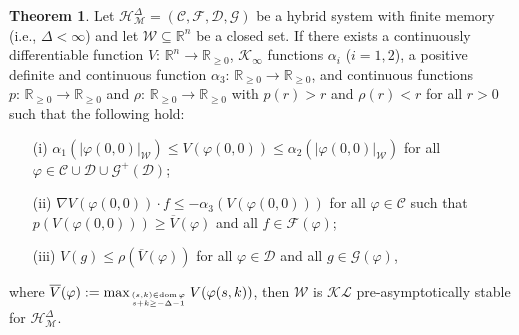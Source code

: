 \documentclass[journal,final,twocolumn]{IEEEtran}
\theoremstyle{definition}
\newtheorem{thm}{Theorem}
\begin{document}
\begin{thm}\label{thm:stability}
Let ${\mathcal{H}_{\mathcal{M}}^{\Delta}}=({\mathcal{C}},{\mathcal{F}},{\mathcal{D}},{\mathcal{G}})$ be a hybrid system with finite memory (i.e., $\Delta<\infty$) and let ${\mathcal{W}}{\subseteq}{\mathbb R}^n$ be a closed set. If there exists a continuously differentiable function $V:\,{\mathbb R}^n{\rightarrow}{\mathbb R}_{\ge 0}$, ${\mathcal{K}}_\infty$ functions $\alpha_i$ ($i=1,2$), a positive definite and continuous function $\alpha_3:\,{\mathbb R}_{\ge 0}{\rightarrow}{\mathbb R}_{\ge 0}$, and continuous functions $p:\,{\mathbb R}_{\ge 0}{\rightarrow}{\mathbb R}_{\ge 0}$ and $\rho:\,{\mathbb R}_{\ge 0}{\rightarrow}{\mathbb R}_{\ge 0}$ with $p(r)>r$ and $\rho(r)<r$ for all $r>0$ such that the following hold:
\begin{itemize}
\item[(i)] $\alpha_1({\left\vert{{\varphi}(0,0)}\right\vert}_{\mathcal{W}})\le V({\varphi}(0,0))\le \alpha_2({\left\vert{{\varphi}(0,0)}\right\vert}_{\mathcal{W}})$ for all ${\varphi}\in {\mathcal{C}}\cup {\mathcal{D}}\cup{\mathcal{G}}^+({\mathcal{D}})$;
\item[(ii)] $\nabla V({\varphi}(0,0))\cdot f\le -\alpha_3 (V({\varphi}(0,0)))$ for all ${\varphi}\in {\mathcal{C}}$ such that $p(V({\varphi}(0,0)))\ge \overline{V}({\varphi})$ and all $f\in{\mathcal{F}}({\varphi})$;
\item[(iii)] $V(g)\le \rho(\overline{V}({\varphi}))$ for all ${\varphi}\in{\mathcal{D}}$ and all $g\in{\mathcal{G}}({\varphi})$,
\end{itemize}
where $\overline{V}({\varphi}):=\max_{(s,k)\in{\text{dom}\,}{\varphi}\atop s+k\ge -\Delta-1} V({\varphi}(s,k))$, then ${\mathcal{W}}$ is ${\mathcal{KL}}$ pre-asymptotically stable for ${\mathcal{H}_{\mathcal{M}}^{\Delta}}$.
\end{thm}
\end{document}
